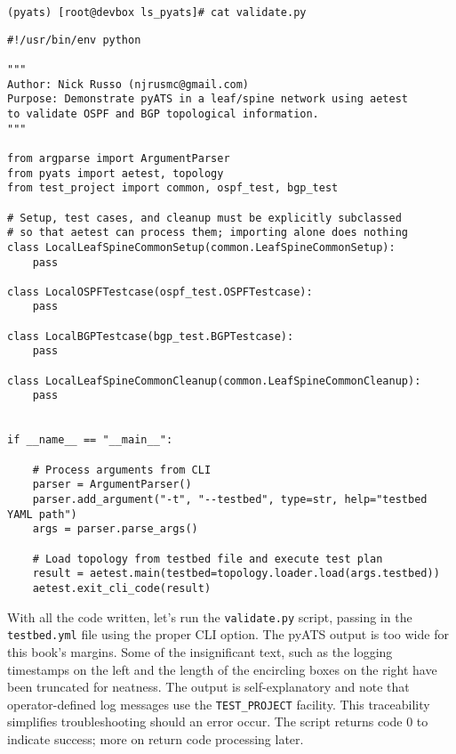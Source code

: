 \begin{verbatim}
(pyats) [root@devbox ls_pyats]# cat validate.py
\end{verbatim}

\begin{verbatim}
#!/usr/bin/env python

"""
Author: Nick Russo (njrusmc@gmail.com)
Purpose: Demonstrate pyATS in a leaf/spine network using aetest
to validate OSPF and BGP topological information.
"""

from argparse import ArgumentParser
from pyats import aetest, topology
from test_project import common, ospf_test, bgp_test

# Setup, test cases, and cleanup must be explicitly subclassed
# so that aetest can process them; importing alone does nothing
class LocalLeafSpineCommonSetup(common.LeafSpineCommonSetup):
    pass

class LocalOSPFTestcase(ospf_test.OSPFTestcase):
    pass

class LocalBGPTestcase(bgp_test.BGPTestcase):
    pass

class LocalLeafSpineCommonCleanup(common.LeafSpineCommonCleanup):
    pass


if __name__ == "__main__":

    # Process arguments from CLI
    parser = ArgumentParser()
    parser.add_argument("-t", "--testbed", type=str, help="testbed YAML path")
    args = parser.parse_args()

    # Load topology from testbed file and execute test plan
    result = aetest.main(testbed=topology.loader.load(args.testbed))
    aetest.exit_cli_code(result)
\end{verbatim}

With all the code written, let's run the \verb|validate.py| script, passing in
the \verb|testbed.yml| file using the proper CLI option. The pyATS output is
too wide for this book's margins. Some of the insignificant text, such as the
logging timestamps on the left and the length of the encircling boxes on the
right have been truncated for neatness. The output is self-explanatory and
note that operator-defined log messages use the \verb|TEST_PROJECT| facility.
This traceability simplifies troubleshooting should an error occur. The script
returns code 0 to indicate success; more on return code processing later.

